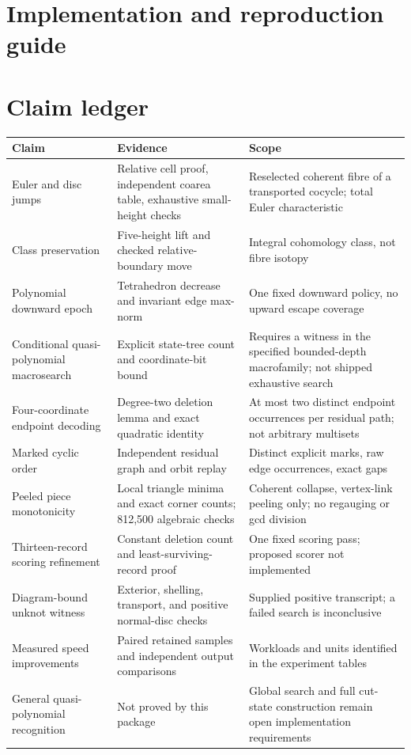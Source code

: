 \documentclass[11pt,letterpaper]{article}
\theoremstyle{definition}
\theoremstyle{remark}
\begin{document}
\appendix
\section{Implementation and reproduction guide}


\clearpage
\section{Claim ledger}
\begin{longtable}{>{\raggedright\arraybackslash}p{}>{\raggedright\arraybackslash}p{}>{\raggedright\arraybackslash}p{}}
\toprule
Claim & Evidence & Scope\\
\midrule
\endhead
Euler and disc jumps & Relative cell proof, independent coarea table,
exhaustive small-height checks & Reselected coherent fibre of a transported
cocycle; total Euler characteristic\\
Class preservation & Five-height lift and checked relative-boundary move &
Integral cohomology class, not fibre isotopy\\
Polynomial downward epoch & Tetrahedron decrease and invariant edge max-norm &
One fixed downward policy, no upward escape coverage\\
Conditional quasi-polynomial macrosearch & Explicit state-tree count and
coordinate-bit bound & Requires a witness in the specified bounded-depth
macrofamily; not shipped exhaustive search\\
Four-coordinate endpoint decoding & Degree-two deletion lemma and exact
quadratic identity & At most two distinct endpoint occurrences per residual
path; not arbitrary multisets\\
Marked cyclic order & Independent residual graph and orbit replay &
Distinct explicit marks, raw edge occurrences, exact gaps\\
Peeled piece monotonicity & Local triangle minima and exact corner counts;
812,500 algebraic checks & Coherent collapse, vertex-link peeling only;
no regauging or gcd division\\
Thirteen-record scoring refinement & Constant deletion count and
least-surviving-record proof & One fixed scoring pass; proposed scorer
not implemented\\
Diagram-bound unknot witness & Exterior, shelling, transport, and positive
normal-disc checks & Supplied positive transcript; a failed search is
inconclusive\\
Measured speed improvements & Paired retained samples and independent
output comparisons & Workloads and units identified in the experiment tables\\
General quasi-polynomial recognition & Not proved by this package &
Global search and full cut-state construction remain open implementation
requirements\\
\bottomrule
\end{longtable}
\end{document}
